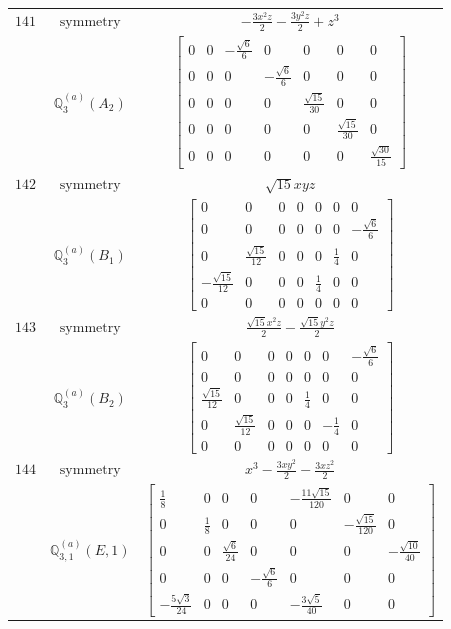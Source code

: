 \documentclass[fleqn,8pt,landscape]{jsarticle}
\begin{document}
\begin{longtable}{ccc}
$ 141 $ & $ \text{symmetry} $ & $ - \frac{3 x^{2} z}{2} - \frac{3 y^{2} z}{2} + z^{3} $ \\
$  $ & $ \mathbb{Q}_{3}^{(a)}(A_{2}) $ & $ \begin{bmatrix} 0 & 0 & - \frac{\sqrt{6}}{6} & 0 & 0 & 0 & 0 \\ 0 & 0 & 0 & - \frac{\sqrt{6}}{6} & 0 & 0 & 0 \\ 0 & 0 & 0 & 0 & \frac{\sqrt{15}}{30} & 0 & 0 \\ 0 & 0 & 0 & 0 & 0 & \frac{\sqrt{15}}{30} & 0 \\ 0 & 0 & 0 & 0 & 0 & 0 & \frac{\sqrt{30}}{15} \end{bmatrix} $ \\ \hline
$ 142 $ & $ \text{symmetry} $ & $ \sqrt{15} x y z $ \\
$  $ & $ \mathbb{Q}_{3}^{(a)}(B_{1}) $ & $ \begin{bmatrix} 0 & 0 & 0 & 0 & 0 & 0 & 0 \\ 0 & 0 & 0 & 0 & 0 & 0 & - \frac{\sqrt{6}}{6} \\ 0 & \frac{\sqrt{15}}{12} & 0 & 0 & 0 & \frac{1}{4} & 0 \\ - \frac{\sqrt{15}}{12} & 0 & 0 & 0 & \frac{1}{4} & 0 & 0 \\ 0 & 0 & 0 & 0 & 0 & 0 & 0 \end{bmatrix} $ \\ \hline
$ 143 $ & $ \text{symmetry} $ & $ \frac{\sqrt{15} x^{2} z}{2} - \frac{\sqrt{15} y^{2} z}{2} $ \\
$  $ & $ \mathbb{Q}_{3}^{(a)}(B_{2}) $ & $ \begin{bmatrix} 0 & 0 & 0 & 0 & 0 & 0 & - \frac{\sqrt{6}}{6} \\ 0 & 0 & 0 & 0 & 0 & 0 & 0 \\ \frac{\sqrt{15}}{12} & 0 & 0 & 0 & \frac{1}{4} & 0 & 0 \\ 0 & \frac{\sqrt{15}}{12} & 0 & 0 & 0 & - \frac{1}{4} & 0 \\ 0 & 0 & 0 & 0 & 0 & 0 & 0 \end{bmatrix} $ \\ \hline
$ 144 $ & $ \text{symmetry} $ & $ x^{3} - \frac{3 x y^{2}}{2} - \frac{3 x z^{2}}{2} $ \\
$  $ & $ \mathbb{Q}_{3,1}^{(a)}(E,1) $ & $ \begin{bmatrix} \frac{1}{8} & 0 & 0 & 0 & - \frac{11 \sqrt{15}}{120} & 0 & 0 \\ 0 & \frac{1}{8} & 0 & 0 & 0 & - \frac{\sqrt{15}}{120} & 0 \\ 0 & 0 & \frac{\sqrt{6}}{24} & 0 & 0 & 0 & - \frac{\sqrt{10}}{40} \\ 0 & 0 & 0 & - \frac{\sqrt{6}}{6} & 0 & 0 & 0 \\ - \frac{5 \sqrt{3}}{24} & 0 & 0 & 0 & - \frac{3 \sqrt{5}}{40} & 0 & 0 \end{bmatrix} $ \\ \hline

\end{longtable}
\end{document}
